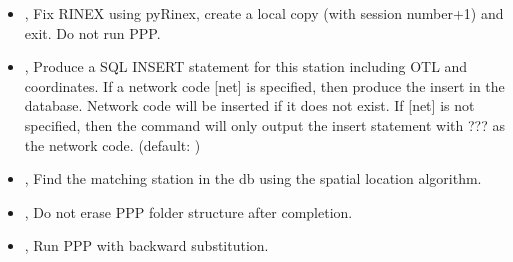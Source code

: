 \documentclass[letterpaper,10pt,english]{sphinxmanual}
\begin{document}
\begin{itemize}
\item {} 
\sphinxAtStartPar
{\hyperref[\detokenize{com:LocateRinex.py--rnx}]{}}, {\hyperref[\detokenize{com:LocateRinex.py---load_rinex}]{}} \sphinxhyphen{} Fix RINEX using pyRinex, create a local copy (with session number+1) and exit. Do not run PPP.

\item {} 
\sphinxAtStartPar
{\hyperref[\detokenize{com:LocateRinex.py--ins}]{}} \sphinxcode{\sphinxupquote{{[}NET{]}}}, {\hyperref[\detokenize{com:LocateRinex.py---insert_sql}]{}} \sphinxcode{\sphinxupquote{{[}NET{]}}} \sphinxhyphen{} Produce a SQL INSERT statement for this station including OTL and coordinates. If a network code {[}net{]} is specified, then produce the insert in the database. Network code will be inserted if it does not exist. If {[}net{]} is not specified, then the command will only output the insert statement with ??? as the network code. (default: )

\item {} 
\sphinxAtStartPar
{\hyperref[\detokenize{com:LocateRinex.py--find}]{}}, {\hyperref[\detokenize{com:LocateRinex.py---find}]{}} \sphinxhyphen{} Find the matching station in the db using the spatial location algorithm.

\item {} 
\sphinxAtStartPar
{\hyperref[\detokenize{com:LocateRinex.py--ne}]{}}, {\hyperref[\detokenize{com:LocateRinex.py---no_erase}]{}} \sphinxhyphen{} Do not erase PPP folder structure after completion.

\item {} 
\sphinxAtStartPar
{\hyperref[\detokenize{com:LocateRinex.py--back}]{}}, {\hyperref[\detokenize{com:LocateRinex.py---backward_substitution}]{}} \sphinxhyphen{} Run PPP with backward substitution.


\end{itemize}
\end{document}
